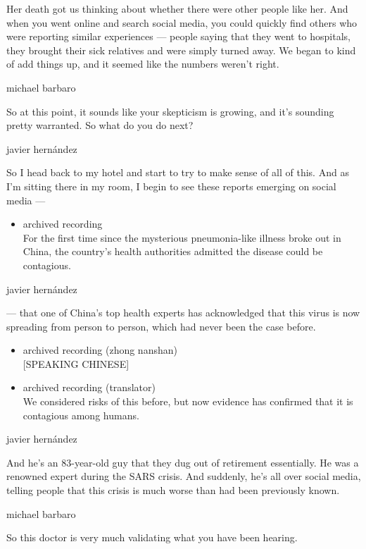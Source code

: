 Her death got us thinking about whether there were other people like
her. And when you went online and search social media, you could quickly
find others who were reporting similar experiences --- people saying
that they went to hospitals, they brought their sick relatives and were
simply turned away. We began to kind of add things up, and it seemed
like the numbers weren't right.

michael barbaro

So at this point, it sounds like your skepticism is growing, and it's
sounding pretty warranted. So what do you do next?

javier hernández

So I head back to my hotel and start to try to make sense of all of
this. And as I'm sitting there in my room, I begin to see these reports
emerging on social media ---

\begin{itemize}
\tightlist
\item
  archived recording\\
  For the first time since the mysterious pneumonia-like illness broke
  out in China, the country's health authorities admitted the disease
  could be contagious.
\end{itemize}

javier hernández

--- that one of China's top health experts has acknowledged that this
virus is now spreading from person to person, which had never been the
case before.

\begin{itemize}
\item
  archived recording (zhong nanshan)\\
  {[}SPEAKING CHINESE{]}
\item
  archived recording (translator)\\
  We considered risks of this before, but now evidence has confirmed
  that it is contagious among humans.
\end{itemize}

javier hernández

And he's an 83-year-old guy that they dug out of retirement essentially.
He was a renowned expert during the SARS crisis. And suddenly, he's all
over social media, telling people that this crisis is much worse than
had been previously known.

michael barbaro

So this doctor is very much validating what you have been hearing.

